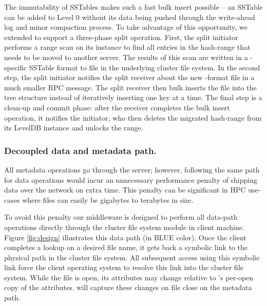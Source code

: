 The immutability of \ldb SSTables makes such a fast bulk insert possible -- an
SSTable can be added to Level 0 without its data being pushed through the
write-ahead log and minor compaction process.
To take advantage of this opportunity, we extended \ldb{}
to support a three-phase split operation. 
First, the split initiator performs a range scan on its \ldb{} instance to find all
entries in the hash-range that needs to be moved to another server. The results
of this scan are written in a \ldb{}-specific SSTable format to file in the
underlying cluster file system. 
In the second step, the split initiator notifies the split receiver about
the new \ldb{}-format file in a much smaller RPC message.
The split receiver then bulk inserts the file into the \ldb{} tree structure 
instead of iteratively inserting one key at a time.
The final step is a clean-up and commit phase: after the receiver completes the 
bulk insert operation, it notifies the 
initiator, who then deletes the migrated hash-range from its LevelDB instance
and unlocks the range.%

\subsubsection*{Decoupled data and metadata path.}
All metadata operations go through the \giga{} server; however, following the
same path for data operations would incur an unnecessary performance penalty 
of shipping data over the network on extra time. 
This penalty can be significant in HPC use-cases where files can easily be  
gigabytes to terabytes in size.

To avoid this penalty our middleware is designed to perform all
data-path operations directly through the cluster file system module in client
machine. 
Figure \ref{fig:design} illustrates this data path (in BLUE color).
Once the client completes a
lookup on a desired file name, it gets back a symbolic link to the physical
path in the cluster file system. All subsequent access using this symbolic
link force the client operating system to resolve this link into the cluster
file system.
While the file is open, its attributes may change relative to \ldb's per-open
copy of the attributes. \giga will capture these changes on file close on the
metadata path.


